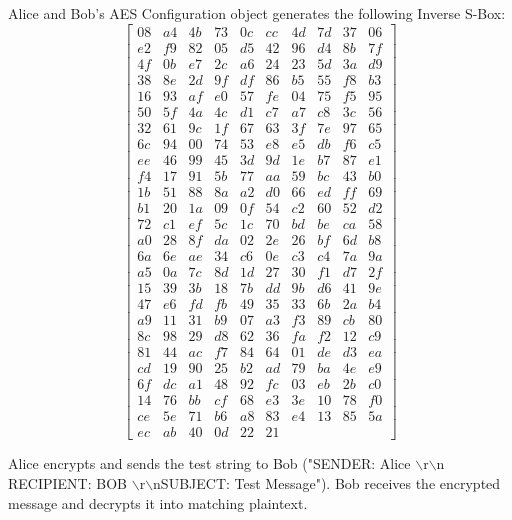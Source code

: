 \documentclass[journal]{IEEEtran}
\begin{document}
Alice and Bob's AES Configuration object generates the following Inverse S-Box:
$$
\begin{bmatrix} 
08 & a4 & 4b & 73 & 0c & cc & 4d & 7d & 37 & 06 \\
e2 & f9 & 82 & 05 & d5 & 42 & 96 & d4 & 8b & 7f \\
4f & 0b & e7 & 2c & a6 & 24 & 23 & 5d & 3a & d9 \\
38 & 8e & 2d & 9f & df & 86 & b5 & 55 & f8 & b3 \\
16 & 93 & af & e0 & 57 & fe & 04 & 75 & f5 & 95 \\
50 & 5f & 4a & 4c & d1 & c7 & a7 & c8 & 3c & 56 \\
32 & 61 & 9c & 1f & 67 & 63 & 3f & 7e & 97 & 65 \\
6c & 94 & 00 & 74 & 53 & e8 & e5 & db & f6 & c5 \\
ee & 46 & 99 & 45 & 3d & 9d & 1e & b7 & 87 & e1 \\
f4 & 17 & 91 & 5b & 77 & aa & 59 & bc & 43 & b0 \\
1b & 51 & 88 & 8a & a2 & d0 & 66 & ed & ff & 69 \\
b1 & 20 & 1a & 09 & 0f & 54 & c2 & 60 & 52 & d2 \\
72 & c1 & ef & 5c & 1c & 70 & bd & be & ca & 58 \\
a0 & 28 & 8f & da & 02 & 2e & 26 & bf & 6d & b8 \\
6a & 6e & ae & 34 & c6 & 0e & c3 & c4 & 7a & 9a \\
a5 & 0a & 7c & 8d & 1d & 27 & 30 & f1 & d7 & 2f \\
15 & 39 & 3b & 18 & 7b & dd & 9b & d6 & 41 & 9e \\
47 & e6 & fd & fb & 49 & 35 & 33 & 6b & 2a & b4 \\
a9 & 11 & 31 & b9 & 07 & a3 & f3 & 89 & cb & 80 \\
8c & 98 & 29 & d8 & 62 & 36 & fa & f2 & 12 & c9 \\
81 & 44 & ac & f7 & 84 & 64 & 01 & de & d3 & ea \\
cd & 19 & 90 & 25 & b2 & ad & 79 & ba & 4e & e9 \\
6f & dc & a1 & 48 & 92 & fc & 03 & eb & 2b & c0 \\
14 & 76 & bb & cf & 68 & e3 & 3e & 10 & 78 & f0 \\
ce & 5e & 71 & b6 & a8 & 83 & e4 & 13 & 85 & 5a \\
ec & ab & 40 & 0d & 22 & 21 
\end{bmatrix}
$$

Alice encrypts and sends the test string to Bob ("SENDER: Alice $\backslash$r$\backslash$n RECIPIENT: BOB $\backslash$r$\backslash$nSUBJECT: Test Message"). Bob receives the encrypted message and decrypts it into matching plaintext. 
\end{document}
